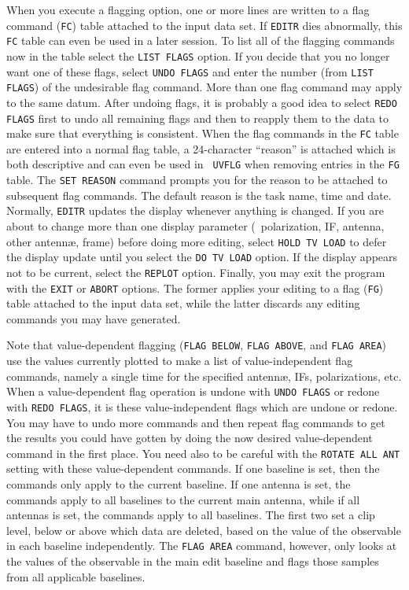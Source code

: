      When you execute a flagging option, one or more lines are written
to a flag command ({\tt FC}) table attached to the input data set.  If
{\tt EDITR} dies abnormally, this {\tt FC} table can even be used in a
later session.  To list all of the flagging commands now in the table
select the {\tt LIST FLAGS} option.  If you decide that you no longer
want one of these flags, select {\tt UNDO FLAGS} and enter the number
(from {\tt LIST FLAGS}) of the undesirable flag command.  More than
one flag command may apply to the same datum.  After undoing flags, it
is probably a good idea to select {\tt REDO FLAGS} first to undo all
remaining flags and then to reapply them to the data to make sure that
everything is consistent.  When the flag commands in the {\tt FC}
table are entered into a normal flag table, a 24-character ``reason''
is attached which is both descriptive and can even be used in {\tt
UVFLG} when removing entries in the {\tt FG} table.  The {\tt SET
REASON} command prompts you for the reason to be attached to
subsequent flag commands.  The default reason is the task name, time
and date.  Normally, {\tt EDITR} updates the display whenever anything
is changed.  If you are about to change more than one display
parameter (\ie\ polarization, IF, antenna, other antenn\ae, frame)
before doing more editing, select {\tt HOLD TV LOAD} to defer the
display update until you select the {\tt DO TV LOAD} option.  If the
display appears not to be current, select the {\tt REPLOT} option.
Finally, you may exit the program with the {\tt EXIT} or {\tt ABORT}
options.  The former applies your editing to a flag ({\tt FG}) table
attached to the input data set, while the latter discards any editing
commands you may have generated.

     Note that value-dependent flagging ({\tt FLAG BELOW}, {\tt FLAG
ABOVE}, and {\tt FLAG AREA}) use the values currently plotted to make
a list of value-independent flag commands, namely a single time for
the specified antenn\ae, IFs, polarizations, etc.  When a
value-dependent flag operation is undone with {\tt UNDO FLAGS} or
redone with {\tt REDO FLAGS}, it is these value-independent flags
which are undone or redone.  You may have to undo more commands and
then repeat flag commands to get the results you could have gotten by
doing the now desired value-dependent command in the first place.  You
need also to be careful with the {\tt ROTATE ALL ANT} setting with
these value-dependent commands.  If one baseline is set, then the
commands only apply to the current baseline.  If one antenna is set,
the commands apply to all baselines to the current main antenna, while
if all antennas is set, the commands apply to all baselines.  The
first two set a clip level, below or above which data are deleted,
based on the value of the observable in each baseline independently.
The {\tt FLAG AREA} command, however, only looks at the values of the
observable in the main edit baseline and flags those samples from all
applicable baselines.

